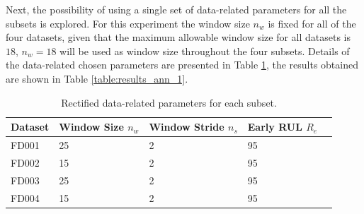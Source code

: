 Next, the possibility of using a single set of data-related parameters for all the subsets is explored. For this experiment the window size $n_w$ is fixed for all of the four datasets, given that the maximum allowable window size for all datasets is $18$, $n_w = 18$ will be used as window size throughout the four subsets. Details of the data-related chosen parameters are presented in Table \ref{table:data_params_1}, the results obtained are shown in Table \ref{table:results_ann_1}. 

\begin{table}[!htb]
\centering
\begin{tabular}{l l l l l}
	\hline
	 Dataset & Window Size $n_w$ & Window Stride $n_s$ & Early RUL $R_e$\\
  	\hline
  	FD001 & 25 & 2 & 95\\
  	FD002 & 15 & 2 & 95\\
  	FD003 & 25 & 2 & 95\\
  	FD004 & 15 & 2 & 95\\
  	\hline
\end{tabular}
\caption{Rectified data-related parameters for each subset.}
\label{table:data_params_1}
\end{table}  

